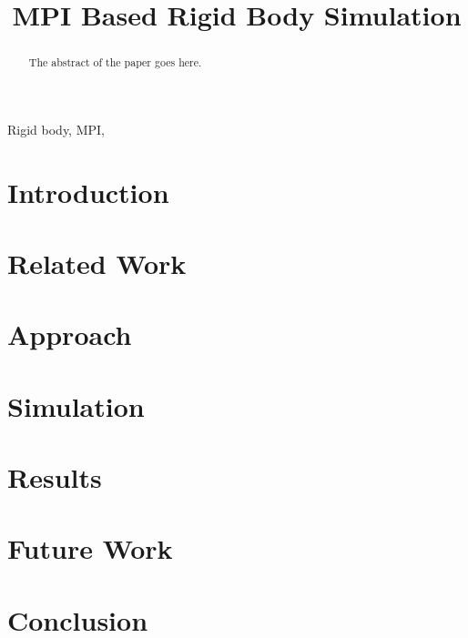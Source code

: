 \documentclass[10pt, conference, compsocconf]{IEEEtran}
\begin{document}
\title{MPI Based Rigid Body Simulation}

\author{

}



\maketitle


\begin{abstract}
  The abstract of the paper goes here.
\end{abstract}


\begin{IEEEkeywords}
  Rigid body, MPI,
\end{IEEEkeywords}


\section{Introduction}

\section{Related Work}

\section{ Approach}

\section{Simulation}

\section{Results}

\section{Future Work}

\section{Conclusion}


\IEEEpeerreviewmaketitle

\end{document}
